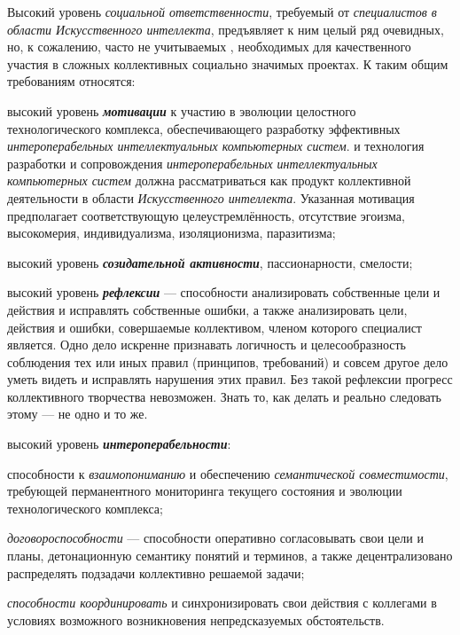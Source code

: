 Высокий уровень \textit{социальной ответственности}, требуемый от \textit{специалистов в области Искусственного интеллекта}, предъявляет к ним целый ряд очевидных, но, к сожалению, часто не учитываемых , необходимых для качественного участия в сложных коллективных социально значимых проектах. К таким общим требованиям относятся:

\begin{textitemize}
	\item  высокий уровень \textbf{\textit{мотивации}} к участию в  эволюции целостного технологического комплекса, обеспечивающего разработку эффективных \textit{интероперабельных интеллектуальных компьютерных систем}.  и  технология разработки и сопровождения \textit{интероперабельных интеллектуальных компьютерных систем} должна рассматриваться как  продукт коллективной деятельности в области \textit{Искусственного интеллекта}. Указанная мотивация предполагает соответствующую целеустремлённость, отсутствие эгоизма, высокомерия, индивидуализма, изоляционизма, паразитизма;
	\medskip
	\item высокий уровень \textbf{\textit{созидательной активности}}, пассионарности, смелости;
	\medskip
	\item высокий уровень \textbf{\textit{рефлексии}} --- способности анализировать собственные цели и действия и исправлять собственные ошибки, а также анализировать цели, действия и ошибки, совершаемые коллективом, членом которого специалист является. Одно дело искренне признавать логичность и целесообразность соблюдения тех или иных правил (принципов, требований) и совсем другое дело уметь видеть и исправлять  нарушения этих правил. Без такой рефлексии прогресс коллективного творчества невозможен. Знать то, как  делать и реально следовать этому --- не одно и то же.
	\medskip
	\item высокий уровень \textbf{\textit{ интероперабельности}}:
	\begin{textitemize}
		\item способности к \textit{взаимопониманию} и обеспечению \textit{семантической совместимости}, требующей перманентного мониторинга текущего состояния и эволюции технологического комплекса;
		\item \textit{договороспособности} --- способности оперативно согласовывать свои цели и планы, детонационную семантику понятий и терминов, а также децентрализовано распределять подзадачи коллективно решаемой задачи;
		\item \textit{способности координировать} и синхронизировать свои действия с коллегами в условиях возможного возникновения непредсказуемых обстоятельств.
	\end{textitemize}
	

\end{textitemize}
